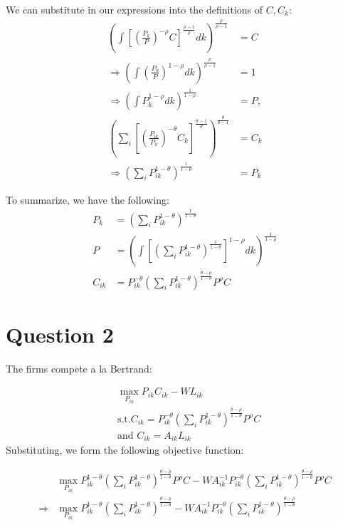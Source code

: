 \documentclass[11pt]{article} %
\begin{document}
We can substitute in our expressions into the definitions of $C,C_k$:
\begin{align*}
\left( \int \left[ \left( \frac{P_k}{P} \right)^{-\rho}C  \right]^{\frac{\rho - 1}{\rho}} dk \right)^{\frac{\rho}{\rho - 1}} &= C\\
\Rightarrow \left( \int  \left( \frac{P_k}{P} \right)^{1-\rho} dk \right)^{\frac{\rho}{\rho - 1}}  &= 1\\
\Rightarrow \left( \int  P_k^{1-\rho} dk \right)^{\frac{1}{ 1-\rho}}  &= P, \\
\left( \sum_i \left[ \left( \frac{P_{ik}}{P_k} \right)^{-\theta} C_k \right]^{\frac{\theta - 1}{\theta}}\right)^{\frac{\theta}{\theta - 1}} &= C_k \\
\Rightarrow \left( \sum_i P_{ik}^{1-\theta} \right)^{\frac{1}{1-\theta}} &= P_k
\end{align*}

To summarize, we have the following:
\begin{align}
P_k &=  \left( \sum_i P_{ik}^{1-\theta} \right)^{\frac{1}{1-\theta}}\\
P &=  \left( \int  \left[  \left( \sum_i P_{ik}^{1-\theta} \right)^{\frac{1}{1-\theta}} \right]^{1-\rho} dk \right)^{\frac{1}{1-\rho}} \\
C_{ik} &= P_{ik}^{-\theta}\left( \sum_i P_{ik}^{1-\theta }\right)^{\frac{ \theta-\rho}{1-\theta }} P^{\rho} C
\end{align}

\section{Question 2}
The firms compete a la Bertrand:

\begin{align*}
&\max_{P_{ik}} P_{ik}C_{ik} - WL_{ik}\\
&\text{s.t.} C_{ik} = P_{ik}^{-\theta}\left( \sum_i P_{ik}^{1-\theta }\right)^{\frac{ \theta-\rho}{1-\theta }} P^{\rho} C\\
&\text{and } C_{ik} = A_{ik}L_{ik}
\end{align*}
Substituting, we form the following objective function:

\begin{align*}
&\max_{P_{ik}}P_{ik}^{1-\theta}\left( \sum_i P_{ik}^{1-\theta }\right)^{\frac{ \theta-\rho}{1-\theta}} P^{\rho} C - WA_{ik}^{-1}P_{ik}^{-\theta}\left( \sum_i P_{ik}^{1-\theta }\right)^{\frac{ \theta-\rho}{1-\theta}} P^{\rho} C \\
\Rightarrow &\max_{P_{ik}}P_{ik}^{1-\theta}\left( \sum_i P_{ik}^{1-\theta}\right)^{\frac{ \theta-\rho}{1-\theta}}  - WA_{ik}^{-1}P_{ik}^{-\theta}\left( \sum_i P_{ik}^{1-\theta}\right)^{\frac{ \theta-\rho}{1-\theta }} 
\end{align*}
\end{document}
